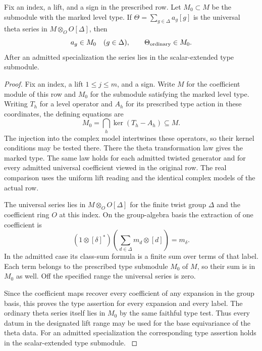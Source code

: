 \begin{lemma}\label{lem:universal-theta-type}
Fix an index, a lift, and a sign in the prescribed row.
Let \(M_0\subset M\) be the submodule with the marked level
type. If \(\Theta=\sum_{g\in\Delta}a_g[g]\) is the universal theta series in \(M\otimes_O O[\Delta]\), then
\[
 a_g\in M_0\quad(g\in\Delta),\qquad \Theta_{\rm ordinary}\in M_0.
\] After an admitted specialization the
series lies in the scalar-extended type submodule.
\end{lemma}

\begin{proof}
Fix an index, a lift \(1\le j\le m\), and a sign.
Write \(M\) for the coefficient module of this row
and \(M_0\) for the submodule satisfying the marked level
type. Writing \(T_h\) for a level operator and \(A_h\) for its prescribed
type action in these coordinates, the defining equations are
\[
                    M_0=\bigcap_h\ker(T_h-A_h)\subseteq M.
\] The injection into the complex model intertwines these
operators, so their kernel conditions may be tested there. There the theta transformation law
gives the marked type. The same law holds for each admitted
twisted generator and for every admitted universal coefficient
viewed in the original row. The real comparison uses the
uniform lift reading and the identical complex models
of the actual row. \label{cor:automorphic-realization-44}

The universal series lies in \(M\otimes_O O[\Delta]\)
for the finite twist group \(\Delta\) and the coefficient
ring \(O\) at this index. On the group-algebra basis the extraction of one coefficient is
\[
  (1\otimes[\delta]^*)\!
    \left(\sum_{d\in\Delta}m_d\otimes[d]\right)=m_\delta .
\] In the admitted case its
class-sum formula is a finite sum over terms of that label.
Each term belongs to the prescribed type submodule \(M_0\) of \(M\), so their sum is in
\(M_0\) as well. Off the specified range the universal
series is zero.

Since the coefficient maps recover
every coefficient of any expansion in the group basis,
this proves the type assertion for every expansion
and every label. The ordinary theta series itself lies
in \(M_0\) by the same faithful type test. Thus every
datum in the designated lift range may be used for the
base equivariance of the theta data. For an admitted
specialization the corresponding type assertion holds
in the scalar-extended type submodule.
\label{cor:automorphic-realization-45}
\end{proof}


